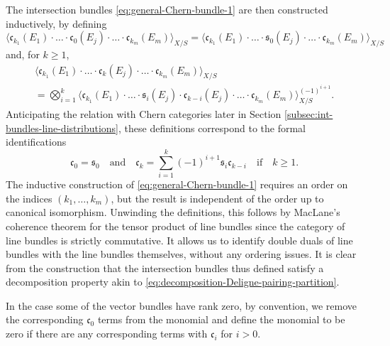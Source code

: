 \documentclass[11pt]{article}
\theoremstyle{plain}
\theoremstyle{definition}
\newcommand{\cfrak}{\mathfrak c}
\newcommand{\sfrak}{\mathfrak s}
\begin{document}
The intersection bundles \eqref{eq:general-Chern-bundle-1} are then constructed inductively, by defining\vspace*{-3pt}
\begin{displaymath}
\langle \cfrak_{k_1}(E_1) \cdot \ldots \cdot \cfrak_0(E_j) \cdot \ldots \cdot \cfrak_{k_m}(E_m) \rangle_{X/S} = \langle \cfrak_{k_1}(E_1) \cdot \ldots \cdot \sfrak_0(E_j) \cdot \ldots \cdot \cfrak_{k_m}(E_m) \rangle_{X/S}
\end{displaymath}
and, for $k \geq 1$,\vspace*{-5pt}
\begin{multline*}
\langle \cfrak_{k_1}(E_1) \cdot \ldots \cdot \cfrak_k(E_j) \cdot \ldots \cdot \cfrak_{k_m}(E_m) \rangle_{X/S}\\[-3pt]
= \bigotimes_{i=1}^{k} \langle \cfrak_{k_1}(E_1) \cdot \ldots \cdot \sfrak_i(E_j) \cdot \cfrak_{k-i}(E_j) \cdot \ldots \cdot \cfrak_{k_m}(E_m) \rangle_{X/S}^{(-1)^{i+1}}.
\end{multline*}
Anticipating the relation with Chern categories later in Section \ref{subsec:int-bundles-line-distributions}, these definitions correspond to the formal identifications\vspace*{-3pt}
\begin{equation}\label{eq:definition-chern-classes}
\cfrak_0=\sfrak_0 \quad\text{and}\quad \cfrak_k = \sum_{i=1}^{k} (-1)^{i+1} \sfrak_i \cfrak_{k-i}\quad\text{if}\quad k\geq 1.
\end{equation}
The inductive construction of \eqref{eq:general-Chern-bundle-1} requires an order on the indices $(k_{1},\ldots, k_{m})$, but the result is independent of the order up to canonical isomorphism. Unwinding the definitions, this follows by MacLane's coherence theorem for the tensor product of line bundles since the category of line bundles is strictly commutative. It allows us to identify double duals of line bundles with the line bundles themselves, without any ordering issues.
It is clear from the construction that the intersection bundles thus defined satisfy a decomposition property akin to \eqref{eq:decomposition-Deligne-pairing-partition}.

In the case some of the vector bundles have rank zero, by convention, we remove the corresponding $\cfrak_0$ terms from the monomial and define the monomial to be zero if there are any corresponding terms with $\cfrak_i$ for $i > 0$.
\end{document}
